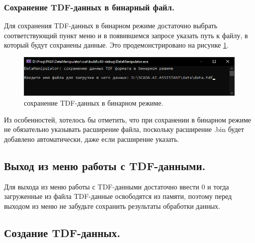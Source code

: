\subsubsection{ \standartTitleFont
  Сохранение TDF-данных в бинарный файл.
} \label{subsubsec:TDFSafeBIN}

{\standartFont

  \par Для сохранения TDF-данных в бинарном режиме достаточно выбрать соответствующий пункт меню и в появившемся запросе указать путь к файлу, в который будут сохранены данные. Это продемонстрировано на рисунке \ref{fig:TDFsafeBIN}.

  \begin{figure}[H]
    \centering
    \includegraphics[width=\textwidth]{images/forDataManipulator/TDFsafeBIN.png}
    \caption{сохранение TDF-данных в бинарном режиме.} 
    \label{fig:TDFsafeBIN}
  \end{figure}

  \par Из особенностей, хотелось бы отметить, что при сохранении в бинарном режиме не обязательно указывать расширение файла, поскольку расширение .bin будет добавлено автоматически, даже если расширение указать. 
}

\subsection{ \standartTitleFont
  Выход из меню работы с TDF-данными.
} \label{subsubsec:TDFOut}

{\standartFont

  \par Для выхода из меню работы с TDF-данными достаточно ввести 0 и тогда загруженные из файла TDF-данные освободятся из памяти, поэтому перед выходом из меню не забудьте сохранить результаты обработки данных. 

  \par
}

\subsection{ \standartTitleFont
  Создание TDF-данных.
} \label{subsubsec:CreateTDF}

